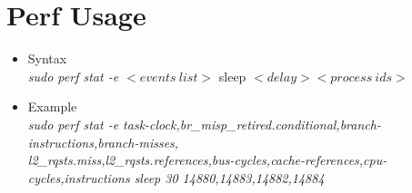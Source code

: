 \section*{Perf Usage}
    \begin{itemize}
    
        \item Syntax\\
        \emph{sudo perf stat -e $< events\ list >$ } sleep $< delay > < process\ ids >$ \\
        \item Example\\
        \emph{sudo perf stat -e task-clock,br\_misp\_retired.conditional,branch-instructions,branch-misses, \\ l2\_rqsts.miss,l2\_rqsts.references,bus-cycles,cache-references,cpu-cycles,instructions  sleep 30 14880,14883,14882,14884}\\
\end{itemize}
